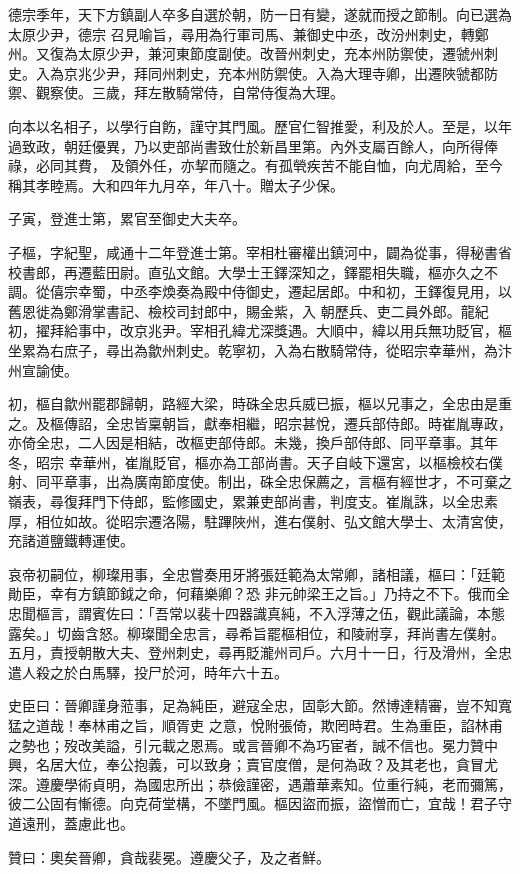 \begin{pinyinscope}
 德宗季年，天下方鎮副人卒多自選於朝，防一日有變，遂就而授之節制。向已選為太原少尹，德宗
 召見喻旨，尋用為行軍司馬、兼御史中丞，改汾州刺史，轉鄭州。又復為太原少尹，兼河東節度副使。改晉州刺史，充本州防禦使，遷虢州刺史。入為京兆少尹，拜同州刺史，充本州防禦使。入為大理寺卿，出遷陜虢都防禦、觀察使。三歲，拜左散騎常侍，自常侍復為大理。



 向本以名相子，以學行自飭，謹守其門風。歷官仁智推愛，利及於人。至是，以年過致政，朝廷優異，乃以吏部尚書致仕於新昌里第。內外支屬百餘人，向所得俸祿，必同其費，
 及領外任，亦挈而隨之。有孤煢疾苦不能自恤，向尤周給，至今稱其孝睦焉。大和四年九月卒，年八十。贈太子少保。



 子寅，登進士第，累官至御史大夫卒。



 子樞，字紀聖，咸通十二年登進士第。宰相杜審權出鎮河中，闢為從事，得秘書省校書郎，再遷藍田尉。直弘文館。大學士王鐸深知之，鐸罷相失職，樞亦久之不調。從僖宗幸蜀，中丞李煥奏為殿中侍御史，遷起居郎。中和初，王鐸復見用，以舊恩徙為鄭滑掌書記、檢校司封郎中，賜金紫，入
 朝歷兵、吏二員外郎。龍紀初，擢拜給事中，改京兆尹。宰相孔緯尤深獎遇。大順中，緯以用兵無功貶官，樞坐累為右庶子，尋出為歙州刺史。乾寧初，入為右散騎常侍，從昭宗幸華州，為汴州宣諭使。



 初，樞自歙州罷郡歸朝，路經大梁，時硃全忠兵威已振，樞以兄事之，全忠由是重之。及樞傳詔，全忠皆稟朝旨，獻奉相繼，昭宗甚悅，遷兵部侍郎。時崔胤專政，亦倚全忠，二人因是相結，改樞吏部侍郎。未幾，換戶部侍郎、同平章事。其年冬，昭宗
 幸華州，崔胤貶官，樞亦為工部尚書。天子自岐下還宮，以樞檢校右僕射、同平章事，出為廣南節度使。制出，硃全忠保薦之，言樞有經世才，不可棄之嶺表，尋復拜門下侍郎，監修國史，累兼吏部尚書，判度支。崔胤誅，以全忠素厚，相位如故。從昭宗遷洛陽，駐蹕陜州，進右僕射、弘文館大學士、太清宮使，充諸道鹽鐵轉運使。



 哀帝初嗣位，柳璨用事，全忠嘗奏用牙將張廷範為太常卿，諸相議，樞曰：「廷範勛臣，幸有方鎮節鉞之命，何藉樂卿？恐
 非元帥梁王之旨。」乃持之不下。俄而全忠聞樞言，謂賓佐曰：「吾常以裴十四器識真純，不入浮薄之伍，觀此議論，本態露矣。」切齒含怒。柳璨聞全忠言，尋希旨罷樞相位，和陵祔享，拜尚書左僕射。五月，責授朝散大夫、登州刺史，尋再貶瀧州司戶。六月十一日，行及滑州，全忠遣人殺之於白馬驛，投尸於河，時年六十五。



 史臣曰：晉卿謹身蒞事，足為純臣，避寇全忠，固彰大節。然博達精審，豈不知寬猛之道哉！奉林甫之旨，順胥吏
 之意，悅附張倚，欺罔時君。生為重臣，諂林甫之勢也；歿改美謚，引元載之恩焉。或言晉卿不為巧宦者，誠不信也。冕力贊中興，名居大位，奉公抱義，可以致身；賣官度僧，是何為政？及其老也，貪冒尤深。遵慶學術貞明，為國忠所出；恭儉謹密，遇蕭華素知。位重行純，老而彌篤，彼二公固有慚德。向克荷堂構，不墜門風。樞因盜而振，盜憎而亡，宜哉！君子守道遠刑，蓋慮此也。



 贊曰：奧矣晉卿，貪哉裴冕。遵慶父子，及之者鮮。



\end{pinyinscope}